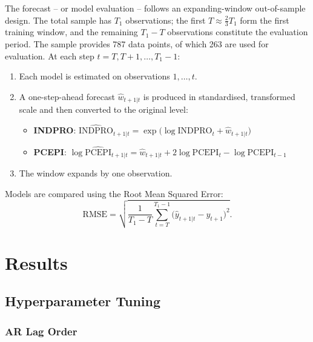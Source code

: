 \documentclass[12pt, a4paper]{article}
\begin{document}
The forecast -- or model evaluation -- follows an expanding-window out-of-sample design. The total sample has $T_1$ observations; the first $T \approx \tfrac{2}{3} T_1$ form the first training window, and the remaining $T_1 - T$ observations constitute the evaluation period. The sample provides 787 data points, of which 263 are used for evaluation. At each step $t = T, T+1, \ldots, T_1 - 1$:
\begin{enumerate}
    \item Each model is estimated on observations $1, \ldots, t$.
    \item A one-step-ahead forecast $\hat{w}_{t+1|t}$ is produced in standardised, transformed scale and then converted to the original level:
          \begin{itemize}
              \item \textbf{INDPRO}: $\widehat{\mathrm{INDPRO}}_{t+1|t} = \exp\!\bigl(\log \mathrm{INDPRO}_t + \hat{w}_{t+1|t}\bigr)$
              \item \textbf{PCEPI}: $\log\widehat{\mathrm{PCEPI}}_{t+1|t} = \hat{w}_{t+1|t} + 2\log\mathrm{PCEPI}_t - \log\mathrm{PCEPI}_{t-1}$
          \end{itemize}
    \item The window expands by one observation.
\end{enumerate}

Models are compared using the Root Mean Squared Error:
\[
    \mathrm{RMSE} = \sqrt{\frac{1}{T_1 - T}\sum_{t=T}^{T_1 - 1}\bigl(\hat{y}_{t+1|t} - y_{t+1}\bigr)^2}.
\]


\section{Results}
\label{sec:results}

\subsection{Hyperparameter Tuning}
\label{sec:res_tuning}

\subsubsection*{AR Lag Order}
\end{document}
